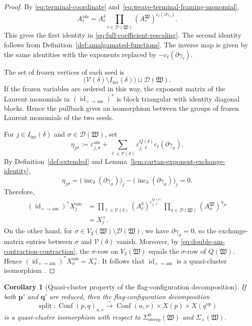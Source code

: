 \documentclass[10pt,a4paper]{article}
\newtheorem{corollary}[theorem]{Corollary}
\theoremstyle{definition}
\theoremstyle{remark}
\newcommand{\Conf}{\operatorname{Conf}}
\newcommand{\Dcal}{\mathcal D}
\newcommand{\Vcal}{\mathcal V}
\newcommand{\eps}{\varepsilon}
\newcommand{\fW}{\mathfrak W}
\newcommand{\Split}{\operatorname{split}}
\newcommand{\id}{\operatorname{id}}
\begin{document}
\begin{proof}
By \eqref{eq:terminal-coordinate}
and~\eqref{eq:weave-terminal-framing-monomial},
\[
 A_\ell^{\mathrm{am}}
 =A_\ell^\delta
  \prod_{\tau\in\Dcal(\fW)}
  (A_\tau^\fW)^{c_\ell(\partial\gamma_\tau)}.
\]
This gives the first identity in
\eqref{eq:full-coefficient-rescaling}.  The second identity follows
from Definition~\ref{def:amalgamated-functions}.  The inverse map is given by
the same identities with the exponents replaced by
\(-c_\ell(\partial\gamma_\tau)\).

The set of frozen vertices of each seed is
\[
 \bigl(\Vcal(\delta)\setminus I_{\mathrm{int}}(\delta)\bigr)
 \sqcup\Dcal(\fW).
\]
If the frozen variables are ordered in this way, the exponent matrix of the
Laurent monomials in \((\id_{\times\to\mathrm{am}})^*\) is block triangular
with identity diagonal blocks.  Hence the pullback gives an isomorphism
between the groups of frozen Laurent monomials of the two seeds.

For \(j\in I_{\mathrm{int}}(\delta)\) and \(\sigma\in\Dcal(\fW)\), set
\[
 \eta_{j\sigma}
 :=\eps^{\mathrm{am}}_{j,\sigma}
  +\sum_{\ell\in\Vcal(\delta)}
        \eps^{Q(\delta)}_{j,\ell}
        c_\ell(\partial\gamma_\sigma).
\]
By Definition~\ref{def:extended} and
Lemma~\ref{lem:cartan-exponent-exchange-identity},
\[
 \eta_{j\sigma}
 =\bigl(\operatorname{inc}_\delta(\partial\gamma_\sigma)\bigr)_j
  -\bigl(\operatorname{inc}_\delta(\partial\gamma_\sigma)\bigr)_j
 =0.
\]
Therefore,
\[
 \begin{aligned}
 (\id_{\times\to\mathrm{am}})^*X_j^{\mathrm{am}}
 &=\prod_{\ell\in\Vcal(\delta)}
   (A_\ell^\delta)^{\eps^{Q(\delta)}_{j,\ell}}
   \prod_{\sigma\in\Dcal(\fW)}
   (A_\sigma^\fW)^{\eta_{j\sigma}}\\
 &=X_j^\times.
 \end{aligned}
\]
On the other hand, for
\(\sigma\in V_3(\fW)\setminus\Dcal(\fW)\), we have
\(\partial\gamma_\sigma=0\), so the exchange-matrix entries between
\(\sigma\) and \(\Vcal(\delta)\) vanish.  Moreover, by
\eqref{eq:double-am-contraction-contraction}, the \(\sigma\)-row on
\(V_3(\fW)\) equals the \(\sigma\)-row of \(Q(\fW)\).  Hence
\((\id_{\times\to\mathrm{am}})^*X_\sigma^{\mathrm{am}}=X_\sigma^\times\).
It follows that \(\id_{\times\to\mathrm{am}}\) is a quasi-cluster isomorphism
\cite[Definition~3.3 and the paragraph following Remark~3.4]
{GorskyKimScrogginSimental2025}.
\end{proof}

\begin{corollary}[Quasi-cluster property of the flag-configuration decomposition]
\label{cor:split-quasi-cluster}
If both \(\mathbf p'\) and \(\mathbf q'\) are reduced, then the
flag-configuration decomposition
\[
 \Split:
 \Conf(p,q)_{u,v}
 \xrightarrow{\sim}
 \Conf(u,v)\times X(p)\times X(q^{\mathrm{op}})
\]
is a quasi-cluster isomorphism with respect to
\(\Sigma_{\mathrm{sweep}}^{\mathrm{fr}}(\fW)\) and
\(\Sigma_\times(\fW)\).
\end{corollary}
\end{document}
